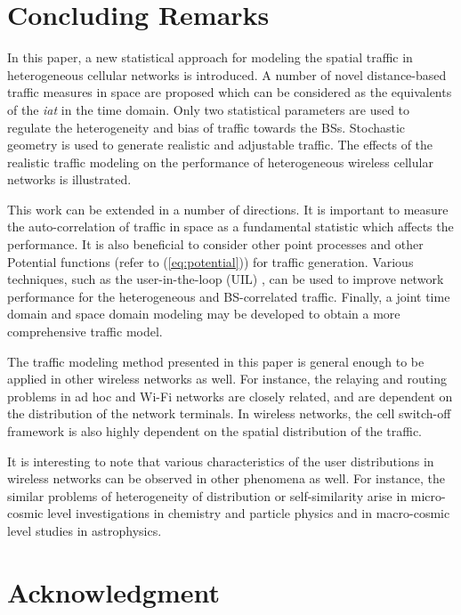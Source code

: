 \documentclass[journal]{IEEEtran}
\begin{document}
\section{Concluding Remarks}
\label{sec:conclusion}

In this paper, a new statistical approach for modeling the spatial traffic in heterogeneous cellular networks is introduced. A number of novel distance-based traffic measures in space are proposed which can be considered as the equivalents of the \textit{iat} in the time domain. Only two statistical parameters are used to regulate the heterogeneity and bias of traffic towards the BSs. Stochastic geometry is used to generate realistic and adjustable traffic. The effects of the realistic traffic modeling on the performance of heterogeneous wireless cellular networks is illustrated.

This work can be extended in a number of directions. It is important to measure the auto-correlation of traffic in space as a fundamental statistic which affects the performance. It is also beneficial to consider other point processes and other Potential functions (refer to (\ref{eq:potential})) for traffic generation. Various techniques, such as the user-in-the-loop (UIL) \cite{RS_APCC10,schoenen2011user,RSComMag2014}, can be used to improve network performance for the heterogeneous and BS-correlated traffic. Finally, a joint time domain and space domain modeling may be developed to obtain a more comprehensive traffic model.

The traffic modeling method presented in this paper is general enough to be applied in other wireless networks as well. For instance, the relaying and routing problems in ad hoc and Wi-Fi networks are closely related, and are dependent on the distribution of the network terminals. In wireless networks, the cell switch-off framework is also highly dependent on the spatial distribution of the traffic.

It is interesting to note that various characteristics of the user distributions in wireless networks can be observed in other phenomena as well. For instance, the similar problems of heterogeneity of distribution or self-similarity arise in micro-cosmic level investigations in chemistry and particle physics and in macro-cosmic level studies in astrophysics.

\section*{Acknowledgment}
\label{sec:ack}
\end{document}
